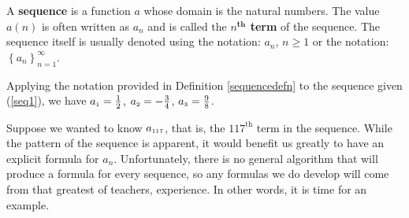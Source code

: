 \documentclass{ximera}
\begin{document}
\colorbox{ResultColor}{\bbm

\begin{definition} \label{sequencedefn}   A \textbf{sequence} is a function $a$ whose domain is the natural numbers. The value $a(n)$ is often written as $a_{n}$ and is called the   \textbf{\boldmath $n^{\textbf{th}}$ term} of the sequence.  The sequence itself is usually denoted using the notation:  $a_{n}$, $n \geq 1$ or the notation:  $\left\{ a_{n} \right\}_{n = 1}^{\infty}$.


\end{definition}

\ebm}

\smallskip

Applying the notation provided in Definition \ref{sequencedefn} to the sequence given (\ref{seq1}), we have $a_{\text{\tiny$1$}} =  \frac{1}{2}$, $a_{\text{\tiny$2$}} =  -\frac{3}{4}$, $a_{\text{\tiny$3$}} =  \frac{9}{8}$. 

Suppose we wanted to know $a_{\text{\tiny$117$}}$, that is, the $117^{\text{th}}$ term in the sequence. While the pattern of the sequence is apparent, it would benefit us greatly to have an explicit formula for $a_{n}$.  Unfortunately, there is no general algorithm that will produce a formula for every sequence, so any formulas we do  develop will come from that greatest of teachers, experience. In other words, it is time for an example.
\end{document}
